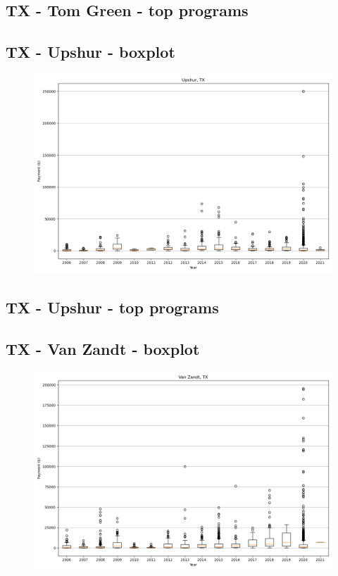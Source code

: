 \subsection*{TX - Tom Green - top programs}

\newpage
\subsection*{TX - Upshur - boxplot}
\begin{figure}[h]
\centering
\includegraphics[width=7in]{../output/boxplots/counties/Upshur-TX_boxplot.png}
\end{figure}


\subsection*{TX - Upshur - top programs}

\newpage
\subsection*{TX - Van Zandt - boxplot}
\begin{figure}[h]
\centering
\includegraphics[width=7in]{../output/boxplots/counties/Van Zandt-TX_boxplot.png}
\end{figure}


